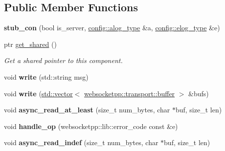 \subsection*{Public Member Functions}
\begin{DoxyCompactItemize}
\item 
\mbox{\label{structstub__con_a7ad39065d251d72c86178e4a1bf4f9f1}} 
{\bfseries stub\+\_\+con} (bool is\+\_\+server, \mbox{\hyperlink{classwebsocketpp_1_1log_1_1stub}{config\+::alog\+\_\+type}} \&a, \mbox{\hyperlink{classwebsocketpp_1_1log_1_1stub}{config\+::elog\+\_\+type}} \&e)
\item 
\mbox{\label{structstub__con_adc3b613da536874da64369433eceaf19}} 
ptr \mbox{\hyperlink{structstub__con_adc3b613da536874da64369433eceaf19}{get\+\_\+shared}} ()
\begin{DoxyCompactList}\small\item\em Get a shared pointer to this component. \end{DoxyCompactList}\item 
\mbox{\label{structstub__con_a66c12a3d422977b7a278020b94d7611b}} 
void {\bfseries write} (std\+::string msg)
\item 
\mbox{\label{structstub__con_a14e97604627969cec94295201745f893}} 
void {\bfseries write} (\mbox{\hyperlink{classstd_1_1vector}{std\+::vector}}$<$ \mbox{\hyperlink{structwebsocketpp_1_1transport_1_1buffer}{websocketpp\+::transport\+::buffer}} $>$ \&bufs)
\item 
\mbox{\label{structstub__con_a3ada58523e3f8e28cf501dc97c16444f}} 
void {\bfseries async\+\_\+read\+\_\+at\+\_\+least} (size\+\_\+t num\+\_\+bytes, char $\ast$buf, size\+\_\+t len)
\item 
\mbox{\label{structstub__con_a95bfb56bec27e86ba2e30af2bca1c213}} 
void {\bfseries handle\+\_\+op} (websocketpp\+::lib\+::error\+\_\+code const \&e)
\item 
\mbox{\label{structstub__con_adce6bc3610b7465c5a3fca87ae02cda1}} 
void {\bfseries async\+\_\+read\+\_\+indef} (size\+\_\+t num\+\_\+bytes, char $\ast$buf, size\+\_\+t len)
\item 

\end{DoxyCompactItemize}
